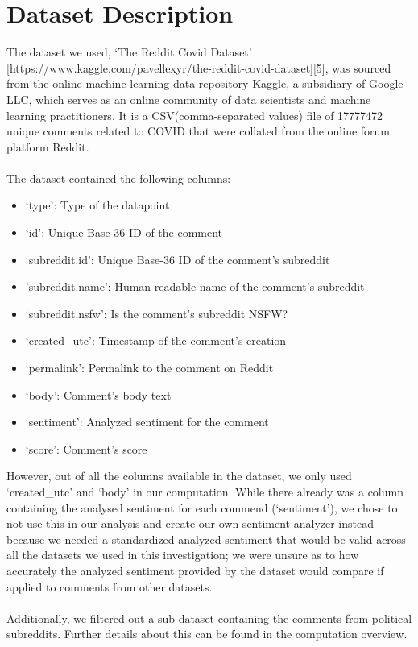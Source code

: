 \documentclass[fontsize=11pt]{article}
\begin{document}
\section*{Dataset Description}
The dataset we used, ‘The Reddit Covid Dataset’ [https://www.kaggle.com/pavellexyr/the-reddit-covid-dataset][5], was sourced from the online machine learning data repository Kaggle, a subsidiary of Google LLC, which serves as an online community of data scientists and machine learning practitioners. It is a CSV(comma-separated values) file of 17777472 unique comments related to COVID that were collated from the online forum platform Reddit. \\\\

The dataset contained the following columns:
\begin{itemize}
    \item ‘type’: Type of the datapoint
    \item ‘id’:  Unique Base-36 ID of the comment
    \item ‘subreddit.id’: Unique Base-36 ID of the comment's subreddit
    \item 'subreddit.name’: Human-readable name of the comment's subreddit
    \item ‘subreddit.nsfw’: Is the comment's subreddit NSFW?
    \item ‘created\_utc’: Timestamp of the comment's creation
    \item ‘permalink’: Permalink to the comment on Reddit
    \item ‘body’: Comment's body text
    \item ‘sentiment’: Analyzed sentiment for the comment
    \item ‘score’: Comment's score  
\end{itemize}
However, out of all the columns available in the dataset, we only used ‘created\_utc’ and ‘body’ in our computation. While there already was a column containing the analysed sentiment for each commend (‘sentiment’), we chose to not use this in our analysis and create our own sentiment analyzer instead because we needed a standardized analyzed sentiment that would be valid across all the datasets we used in this investigation; we were unsure as to how accurately the analyzed sentiment provided by the dataset would compare if applied to comments from other datasets. \\\\
Additionally, we filtered out a sub-dataset containing the comments from political subreddits. Further details about this can be found in the computation overview.\\
\end{document}
